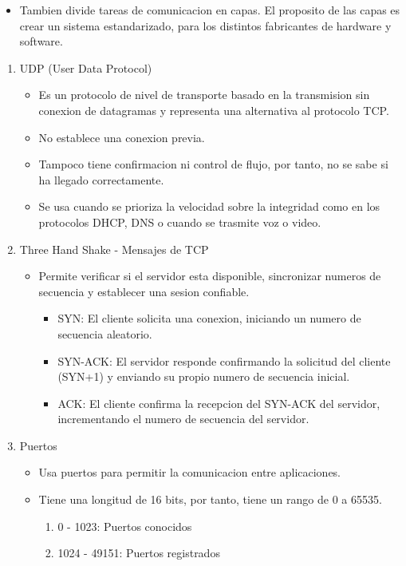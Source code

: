 \documentclass[11pt]{article}
\begin{document}
\begin{enumerate}
\begin{enumerate}
\begin{itemize}
\item Tambien divide tareas de comunicacion en capas. El proposito de las capas es crear un sistema estandarizado, para los distintos fabricantes de hardware y software.
\end{itemize}
\begin{enumerate}
\item UDP (User Data Protocol)
\label{sec:orgaa02bae}
\begin{itemize}
\item Es un protocolo de nivel de transporte basado en la transmision sin conexion de datagramas y representa una alternativa al protocolo TCP.
\item No establece una conexion previa.
\item Tampoco tiene confirmacion ni control de flujo, por tanto, no se sabe si ha llegado correctamente.
\item Se usa cuando se prioriza la velocidad sobre la integridad como en los protocolos DHCP, DNS o cuando se trasmite voz o video.
\end{itemize}
\item Three Hand Shake - Mensajes de TCP
\label{sec:orgb70d856}
\begin{itemize}
\item Permite verificar si el servidor esta disponible, sincronizar numeros de secuencia y establecer una sesion confiable.
\begin{itemize}
\item SYN: El cliente solicita una conexion, iniciando un numero de secuencia aleatorio.
\item SYN-ACK: El servidor responde confirmando la solicitud del cliente (SYN+1) y enviando su propio numero de secuencia inicial.
\item ACK: El cliente confirma la recepcion del SYN-ACK del servidor, incrementando el numero de secuencia del servidor.
\end{itemize}
\end{itemize}
\item Puertos
\label{sec:org4772c70}
\begin{itemize}
\item Usa puertos para permitir la comunicacion entre aplicaciones.
\item Tiene una longitud de 16 bits, por tanto, tiene un rango de 0 a 65535.
\begin{enumerate}
\item 0 - 1023: Puertos conocidos
\item 1024 - 49151: Puertos registrados

\end{enumerate}
\end{itemize}
\end{enumerate}
\end{enumerate}
\end{enumerate}
\end{document}
